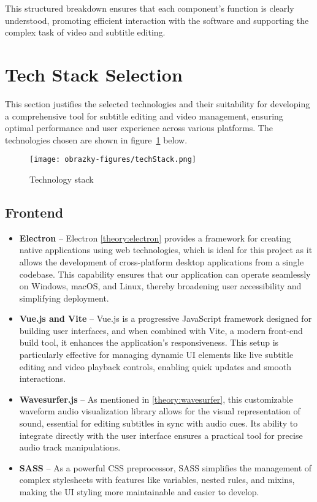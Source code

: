 This structured breakdown ensures that each component's function is clearly understood, promoting efficient interaction with the software and supporting the complex task of video and subtitle editing.
  
\section{Tech Stack Selection}

This section justifies the selected technologies and their suitability for developing a comprehensive tool for subtitle editing and video management, ensuring optimal performance and user experience across various platforms. The technologies chosen are shown in figure~\ref{fig:design:tech:stack} below.

\begin{figure}[ht]
\centering
\texttt{[image: obrazky-figures/techStack.png]}
\caption{Technology stack}
\label{fig:design:tech:stack}
\end{figure}

\subsection{Frontend}
\begin{itemize}
\item \textbf{Electron} -- Electron \ref{theory:electron} provides a framework for creating native applications using web technologies, which is ideal for this project as it allows the development of cross-platform desktop applications from a single codebase. This capability ensures that our application can operate seamlessly on Windows, macOS, and Linux, thereby broadening user accessibility and simplifying deployment.
\item \textbf{Vue.js and Vite} -- Vue.js is a progressive JavaScript framework designed for building user interfaces, and when combined with Vite, a modern front-end build tool, it enhances the application’s responsiveness. This setup is particularly effective for managing dynamic UI elements like live subtitle editing and video playback controls, enabling quick updates and smooth interactions.
\item \textbf{Wavesurfer.js} -- As mentioned in \ref{theory:wavesurfer}, this customizable waveform audio visualization library allows for the visual representation of sound, essential for editing subtitles in sync with audio cues. Its ability to integrate directly with the user interface ensures a practical tool for precise audio track manipulations.
\item \textbf{SASS} -- As a powerful CSS preprocessor, SASS simplifies the management of complex stylesheets with features like variables, nested rules, and mixins, making the UI styling more maintainable and easier to develop.
\end{itemize}

